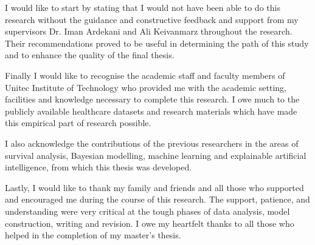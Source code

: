 I would like to start by stating that I would not have been able to do this research without the
guidance and constructive feedback and support from my supervisors Dr. Iman Ardekani and Ali
Keivanmarz throughout the research. Their recommendations proved to be useful in determining
the path of this study and to enhance the quality of the final thesis.

Finally I would like to recognise the academic staff and faculty members of Unitec Institute of
Technology who provided me with the academic setting, facilities and knowledge necessary to
complete this research.
I owe much to the publicly available healthcare datasets and research materials which have
made this empirical part of research possible.

I also acknowledge the contributions of the
previous researchers in the areas of survival analysis, Bayesian modelling, machine learning and
explainable artificial intelligence, from which this thesis was developed.

Lastly, I would like to thank my family and friends and all those who supported and encouraged
me during the course of this research. The support, patience, and understanding were very
critical at the tough phases of data analysis, model construction, writing and revision.
I owe my heartfelt thanks to all those who helped in the completion of my master’s thesis.
